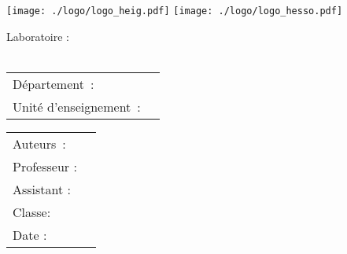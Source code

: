 \begin{center}
\texttt{[image: ./logo/logo\_heig.pdf]}
\hfill \texttt{[image: ./logo/logo\_hesso.pdf]}
\end{center}

\vfill

\begin{center}
	\Large Laboratoire \nbrLabo:\\
	\huge \titre \\
\end{center}


\begin{center}
	\begin{tabular}{l l}
		Département :          & \departement\\
		Unité d'enseignement : & \cours\\
	\end{tabular}
\end{center}


\vfill


\begin{tabular}{l l}
	\Large	Auteurs :		& \Large \nomAuteur\\
	Professeur :			& \prof\\
	Assistant :				& \assistant\\
	Classe:					& \classe\\
	Date :					& \displaydate{date}\\
\end{tabular}

\thispagestyle{empty}
\setcounter{page}{1}